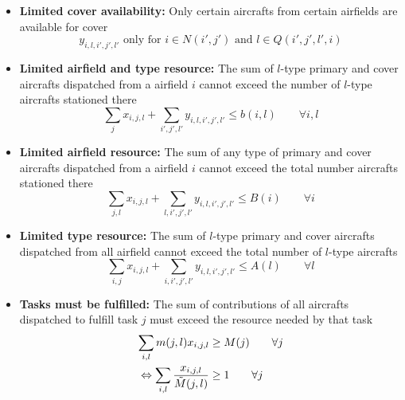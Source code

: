 \documentclass{article}
\begin{document}
\begin{itemize}
\item 
\textbf{Limited cover availability:}
Only certain aircrafts from certain airfields are available for cover
\begin{equation} \label{eqn:constraint_cover_availability}
    y_{i, l, i', j', l'} \text{ only for } i \in N(i', j') \text{ and } l \in Q(i', j', l', i)
\end{equation}

\item
\textbf{Limited airfield and type resource:}
The sum of $l$-type primary and cover aircrafts dispatched from a airfield $i$ cannot exceed the number of $l$-type aircrafts stationed there
\begin{equation} \label{eqn:constraint_airfield_type_resource}
    \sum_j x_{i, j, l} + \sum_{i', j', l'}  y_{i, l, i', j', l'} \leq b(i, l) \qquad  \forall i, l 
\end{equation}

\item
\textbf{Limited airfield resource:}
The sum of any type of primary and cover aircrafts dispatched from a airfield $i$ cannot exceed the total number aircrafts stationed there
\begin{equation} \label{eqn:constraint_airfield_total_resource}
    \sum_{j, l} x_{i,j,l} + \sum_{l, i', j', l'} y_{i, l, i', j', l'} \leq B(i) \qquad \forall i
\end{equation}

\item
\textbf{Limited type resource:}
The sum of $l$-type primary and cover aircrafts dispatched from all airfield cannot exceed the total number of $l$-type aircrafts
\begin{equation} \label{eqn:constraint_type_total_resource}
    \sum_{i, j} x_{i, j, l} + \sum_{i, i', j', l'} y_{i, l, i', j', l'} \leq A(l) \qquad \forall l
\end{equation}

\item
\textbf{Tasks must be fulfilled:}
The sum of contributions of all aircrafts dispatched to fulfill task $j$ must exceed the resource needed by that task
\begin{align}
    \sum_{i, l} m(j, l) x_{i, j, l} & \geq M(j)  \qquad \forall j  \notag \\
    \Leftrightarrow \sum_{i, l} \frac{x_{i, j, l}}{\tilde M(j, l)}  & \geq 1  \qquad \forall j \label{eqn:constraint_task_fulfilled} 
\end{align}


\end{itemize}
\end{document}
